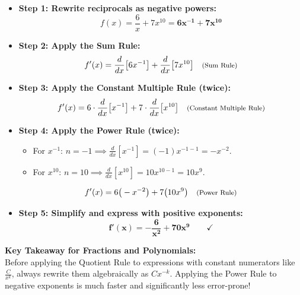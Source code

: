 \documentclass[10.5pt]{article}
\begin{document}
\begin{itemize}[leftmargin=1.2em, topsep=1pt, itemsep=4pt]
  \item \textbf{Step 1: Rewrite reciprocals as negative powers:}
  \[
    f(x) = \frac{6}{x} + 7x^{10} = \mathbf{6x^{-1} + 7x^{10}}
  \]
  \item \textbf{Step 2: Apply the Sum Rule:}
  \[
    f'(x) = \frac{d}{dx}\big[6x^{-1}\big] + \frac{d}{dx}\big[7x^{10}\big] \quad \text{\footnotesize (Sum Rule)}
  \]
  \item \textbf{Step 3: Apply the Constant Multiple Rule (twice):}
  \[
    f'(x) = 6 \cdot \frac{d}{dx}\big[x^{-1}\big] + 7 \cdot \frac{d}{dx}\big[x^{10}\big] \quad \text{\footnotesize (Constant Multiple Rule)}
  \]
  \item \textbf{Step 4: Apply the Power Rule (twice):}
  \begin{itemize}[label=--]
    \item For $x^{-1}$: $n = -1 \implies \frac{d}{dx}[x^{-1}] = (-1) x^{-1 - 1} = -x^{-2}$.
    \item For $x^{10}$: $n = 10 \implies \frac{d}{dx}[x^{10}] = 10 x^{10 - 1} = 10 x^9$.
  \end{itemize}
  \[
    f'(x) = 6\big(-x^{-2}\big) + 7\big(10 x^9\big) \quad \text{\footnotesize (Power Rule)}
  \]
  \item \textbf{Step 5: Simplify and express with positive exponents:}
  \[
    \mathbf{f'(x) = -\frac{6}{x^2} + 70x^9} \qquad \checkmark
  \]
\end{itemize}

\vspace{0.03in}

\begin{tcolorbox}[colback=chalkblue!6, colframe=chalkblue, boxrule=1pt, arc=3pt, left=8pt, right=8pt, top=4pt, bottom=4pt]
\textbf{Key Takeaway for Fractions and Polynomials:}\\[1pt]
Before applying the Quotient Rule to expressions with constant numerators like $\frac{C}{x^k}$, always rewrite them algebraically as $C x^{-k}$. Applying the Power Rule to negative exponents is much faster and significantly less error-prone!
\end{tcolorbox}
\end{document}
